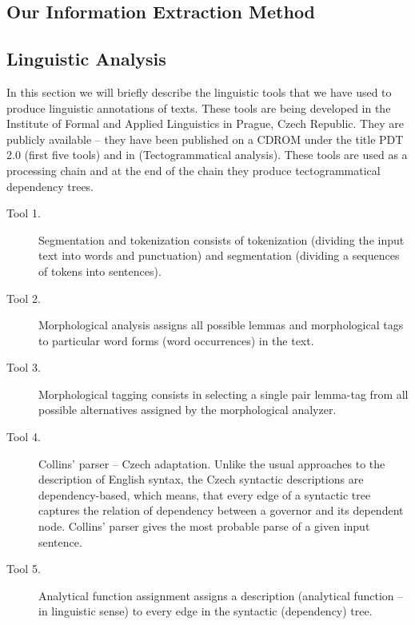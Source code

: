 \begin{multicols}{2}
\section{Our Information Extraction Method} \label{dedek:IEMethod}
\subsection{Linguistic Analysis}
In this section we will briefly describe the linguistic tools that
we have used to produce linguistic annotations of texts. 
These tools are being developed in the Institute of Formal
and Applied Linguistics in Prague, Czech Republic. They
are publicly available -- they have been published on a CDROM
under the title PDT 2.0 \cite{dedek:PDT20_CD} (first five tools) and in
\cite{dedek:KlTransformationBasedTectogrammatical2006} (Tectogrammatical analysis). These tools are used as a
processing chain and at the end of the chain they produce
tectogrammatical \cite{dedek:MiBeAnnotationtectogrammatical2006} dependency trees. 


\begin{description}
 
	\item[Tool 1.] Segmentation and tokenization consists of tokenization
(dividing the input text into words and punctuation)
and segmentation (dividing a sequences of tokens
into sentences).

	\item[Tool 2.] Morphological analysis assigns all possible lemmas
and morphological tags to particular word forms (word
occurrences) in the text.

	\item[Tool 3.] Morphological tagging consists in selecting a single
pair lemma-tag from all possible alternatives assigned
by the morphological analyzer.

	\item[Tool 4.] Collins' parser -- Czech adaptation. 
Unlike the usual approaches to the description of
English syntax, the Czech syntactic descriptions are
dependency-based, which means, that every edge of
a syntactic tree captures the relation of dependency
between a governor and its dependent node. Collins'
parser gives the most probable parse of a given input
sentence.

	\item[Tool 5.] Analytical function assignment assigns a description
(analytical function -- in linguistic sense) to every edge
in the syntactic (dependency) tree.


\end{description}
\end{multicols}
